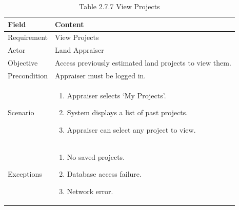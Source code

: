 \documentclass[12pt,oneside]{report}
\begin{document}
\begin{table}[H]
\centering
\caption{Table 2.7.7 View Projects}
\label{tab:req-view-projects}
\begin{tabularx}{\textwidth}{|p{3cm}|X|}
\hline
\textbf{Field} & \textbf{Content} \\ \hline

Requirement & View Projects \\ \hline

Actor & Land Appraiser \\ \hline

Objective & Access previously estimated land projects to view them. \\ \hline

Precondition & Appraiser must be logged in. \\ \hline

Scenario & 
\begin{minipage}[t]{0.75\textwidth}
\begin{enumerate}[leftmargin=*,label=\arabic*.]
\item Appraiser selects ‘My Projects’.
\item System displays a list of past projects.
\item Appraiser can select any project to view.
\end{enumerate}
\end{minipage} \\ \hline

Exceptions & 
\begin{minipage}[t]{0.75\textwidth}
\begin{enumerate}[leftmargin=*,label=\arabic*.]
\item No saved projects.
\item Database access failure.
\item Network error.
\end{enumerate}
\end{minipage} \\ \hline
\end{tabularx}
\end{table}
\end{document}
